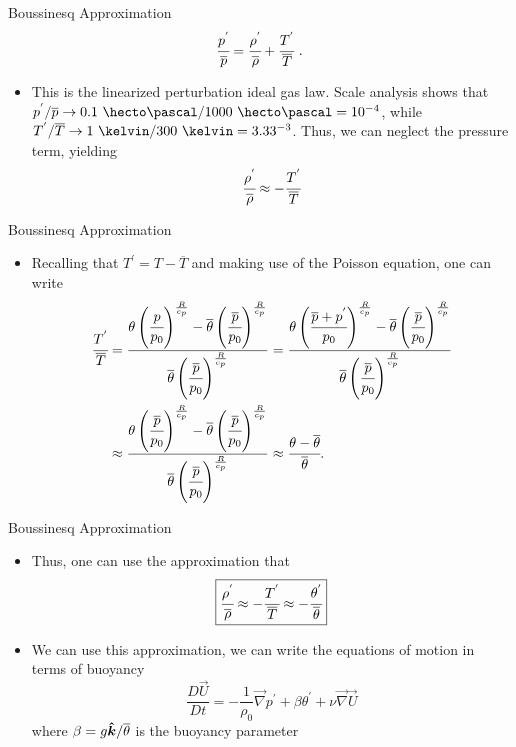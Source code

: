 \begin{frame}{Boussinesq Approximation}
$$
\cfrac{p^{'}}{\overline{p}} = \cfrac{\rho^{'}}{\overline{\rho}} + \cfrac{T^{'}}{\overline{T}} \mbox{ .}
$$
\begin{itemize}
	\item This is the linearized perturbation ideal gas law. Scale analysis shows that
	$p^{'}/\overline{p} \rightarrow 0.1\ \hecto\pascal / 1000\ \hecto\pascal = 10^{-4}$, while $T^{'} / \overline{T} \rightarrow 1\ \kelvin / 300\ \kelvin = 3.33\time10^{-3}$. Thus, we can neglect the pressure term, yielding
	$$\cfrac{\rho^{'}}{\overline{\rho}} \approx - \cfrac{T^{'}}{\overline{T}} $$
	\end{itemize}
\end{frame}
\begin{frame}{Boussinesq Approximation}

\begin{itemize}
	\item Recalling that $T^{'} = T - \overline{T}$ and making use of the Poisson equation,  one can write
\begin{align*}
\cfrac{T^{'}}{\overline{T}} &= \frac{\theta \left(\cfrac{p}{p_0}\right)^{\frac{R}{c_p}} - \overline{\theta} \left(\cfrac{\overline{p}}{p_0}\right)^{\frac{R}{c_p}}}{\overline{\theta} \left(\cfrac{\overline{p}}{p_0}\right)^{\frac{R}{c_p}}} = \frac{\theta \left(\cfrac{\overline{p} + p^{'}}{p_0}\right)^{\frac{R}{c_p}} - \overline{\theta} \left(\cfrac{\overline{p}}{p_0}\right)^{\frac{R}{c_p}}}{\overline{\theta} \left(\cfrac{\overline{p}}{p_0}\right)^{\frac{R}{c_p}}}\\& \approx \frac{\theta \left(\cfrac{\overline{p}}{p_0}\right)^{\frac{R}{c_p}} - \overline{\theta} \left(\cfrac{\overline{p}}{p_0}\right)^{\frac{R}{c_p}}}{\overline{\theta} \left(\cfrac{\overline{p}}{p_0}\right)^{\frac{R}{c_p}}} \approx \cfrac{\theta - \overline{\theta}}{\overline{\theta}}.
\end{align*}
	\end{itemize}
\end{frame}
\begin{frame}{Boussinesq Approximation}

\begin{itemize}
	\item Thus, one can use the approximation that 
$$
\boxed{\cfrac{\rho^{'}}{\overline{\rho}} \approx - \cfrac{T^{'}}{\overline{T}} \approx - \cfrac{\theta^{'}}{\overline{\theta}}}
$$
\item We can use this approximation, we can write the equations of motion in terms of buoyancy
$$\boxed{\frac{D\vec U}{Dt} = -\frac{1}{\rho_0}\vec{\nabla}  p^\prime + \beta \theta^\prime + \nu \vec{\nabla}\vec{U}}$$
where $\beta = g\boldsymbol{\hat{k}} / \overline{\theta}$ is the buoyancy parameter
	\end{itemize}
\end{frame}

